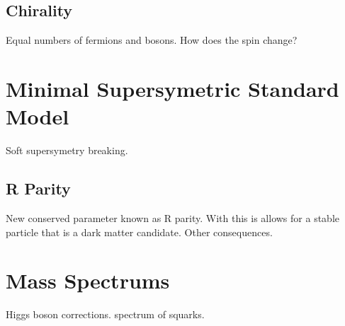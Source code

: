\subsection{Chirality}
\label{subsec:chiral}

Equal numbers of fermions and bosons. How does the spin change? 

\section{Minimal Supersymetric Standard Model}
\label{sec:MSSM}

Soft supersymetry breaking. 

\subsection{R Parity}
\label{subsec:rparity}

New conserved parameter known as R parity. With this is allows for a stable particle that is a dark matter candidate. Other consequences.

\section{Mass Spectrums}

Higgs boson corrections. spectrum of squarks. 






